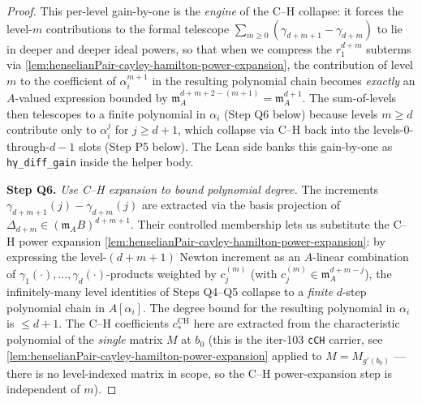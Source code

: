 \begin{proof}
This per-level gain-by-one is the \emph{engine} of the
C--H collapse: it forces the level-$m$ contributions to the
formal telescope $\sum_{m \ge 0} (\gamma_{d+m+1} - \gamma_{d+m})$
to lie in deeper and deeper ideal powers, so that when we
compress the $r_1^{d+m}$ subterms via
\cref{lem:henselianPair-cayley-hamilton-power-expansion}, the
contribution of level $m$ to the coefficient of $\alpha_i^{m+1}$
in the resulting polynomial chain becomes \emph{exactly} an
$A$-valued expression bounded by
$\mathfrak m_A^{d+m+2 - (m+1)} = \mathfrak m_A^{d+1}$. The
sum-of-levels then telescopes to a finite polynomial in
$\alpha_i$ (Step Q6 below) because levels $m \ge d$ contribute
only to $\alpha_i^{j}$ for $j \ge d+1$, which collapse via
C--H back into the levels-$0$-through-$d-1$ slots (Step P5
below). The Lean side banks this gain-by-one as
\texttt{hγ\_diff\_gain} inside the helper body.

\textbf{Step Q6.} \emph{Use C--H expansion to bound polynomial
degree.} The increments $\gamma_{d+m+1}(j) - \gamma_{d+m}(j)$ are
extracted via the basis projection of $\Delta_{d+m} \in
(\mathfrak m_A B)^{d+m+1}$. Their controlled membership lets us
substitute the C--H power expansion
\cref{lem:henselianPair-cayley-hamilton-power-expansion}: by
expressing the level-$(d+m+1)$ Newton increment as an $A$-linear
combination of $\gamma_1(\cdot), \ldots, \gamma_d(\cdot)$-products
weighted by $c^{(m)}_j$ (with $c^{(m)}_j \in
\mathfrak m_A^{d+m-j}$), the infinitely-many level identities of
Steps Q4--Q5 collapse to a \emph{finite} $d$-step polynomial
chain in $A[\alpha_i]$. The degree bound for the resulting
polynomial in $\alpha_i$ is $\le d + 1$. The C--H coefficients
$c^{\mathrm{CH}}_*$ here are extracted from the characteristic
polynomial of the \emph{single} matrix $M$ at $b_0$ (this is the
iter-103 \texttt{cCH} carrier, see
\cref{lem:henselianPair-cayley-hamilton-power-expansion} applied
to $M = M_{g'(b_0)}$ — there is no level-indexed matrix in scope,
so the C--H power-expansion step is independent of $m$).


\end{proof}
